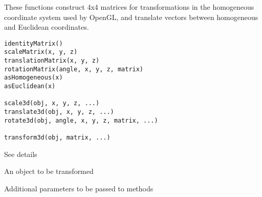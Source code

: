 \begin{Description}\relax
These functions construct 4x4 matrices for transformations
in the homogeneous coordinate system used by OpenGL, and translate
vectors between homogeneous and Euclidean coordinates.
\end{Description}
\begin{Usage}
\begin{verbatim}
identityMatrix()
scaleMatrix(x, y, z)
translationMatrix(x, y, z)
rotationMatrix(angle, x, y, z, matrix)
asHomogeneous(x)
asEuclidean(x)

scale3d(obj, x, y, z, ...)
translate3d(obj, x, y, z, ...)
rotate3d(obj, angle, x, y, z, matrix, ...)

transform3d(obj, matrix, ...)

\end{verbatim}
\end{Usage}
\begin{Arguments}
\begin{ldescription}
\item[\code{x, y, z, angle, matrix}] See details
\item[\code{obj}] An object to be transformed
\item[\code{...}] Additional parameters to be passed to methods
\end{ldescription}
\end{Arguments}
